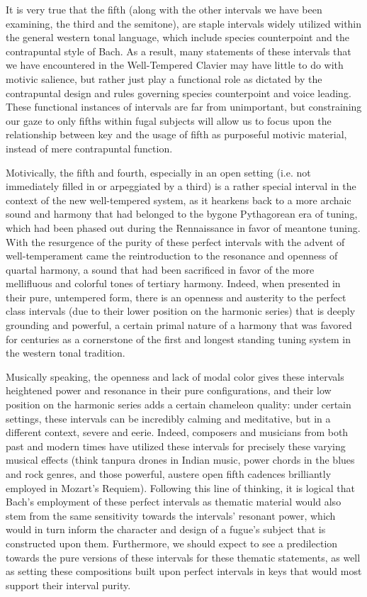 It is very true that the fifth (along with the other intervals we have
been examining, the third and the semitone), are staple intervals widely
utilized within the general western tonal language, which include
species counterpoint and the contrapuntal style of Bach. As a result,
many statements of these intervals that we have encountered in the
Well-Tempered Clavier may have little to do with motivic salience, but
rather just play a functional role as dictated by the contrapuntal
design and rules governing species counterpoint and voice leading. These
functional instances of intervals are far from unimportant, but
constraining our gaze to only fifths within fugal subjects will allow us
to focus upon the relationship between key and the usage of fifth as
purposeful motivic material, instead of mere contrapuntal function.

Motivically, the fifth and fourth, especially in an open setting (i.e.
not immediately filled in or arpeggiated by a third) is a rather special
interval in the context of the new well-tempered system, as it hearkens
back to a more archaic sound and harmony that had belonged to the bygone
Pythagorean era of tuning, which had been phased out during the
Rennaissance in favor of meantone tuning. With the resurgence of the
purity of these perfect intervals with the advent of well-temperament
came the reintroduction to the resonance and openness of quartal
harmony, a sound that had been sacrificed in favor of the more
mellifluous and colorful tones of tertiary harmony. Indeed, when
presented in their pure, untempered form, there is an openness and
austerity to the perfect class intervals (due to their lower position on
the harmonic series) that is deeply grounding and powerful, a certain
primal nature of a harmony that was favored for centuries as a
cornerstone of the first and longest standing tuning system in the
western tonal tradition.

Musically speaking, the openness and lack of modal color gives these
intervals heightened power and resonance in their pure configurations,
and their low position on the harmonic series adds a certain chameleon
quality: under certain settings, these intervals can be incredibly
calming and meditative, but in a different context, severe and eerie.
Indeed, composers and musicians from both past and modern times have
utilized these intervals for precisely these varying musical effects
(think tanpura drones in Indian music, power chords in the blues and
rock genres, and those powerful, austere open fifth cadences brilliantly
employed in Mozart's Requiem). Following this line of thinking, it is
logical that Bach's employment of these perfect intervals as thematic
material would also stem from the same sensitivity towards the
intervals' resonant power, which would in turn inform the character and
design of a fugue's subject that is constructed upon them. Furthermore,
we should expect to see a predilection towards the pure versions of
these intervals for these thematic statements, as well as setting these
compositions built upon perfect intervals in keys that would most
support their interval purity.

